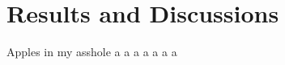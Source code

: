 \chapter{Results and Discussions}
\label{chap:results}

Apples in my asshole \cite{projthesis}
a \cite{claerbout1991scrutiny}
a \cite{landes1951scrutiny}
a \cite{omar2013machine}
a \cite{wei2022lstmautoencoder}
a \cite{julia}
a \cite{apSensing2019railwaydas}
a \cite{DBLP:journals/corr/SrivastavaMS15}








